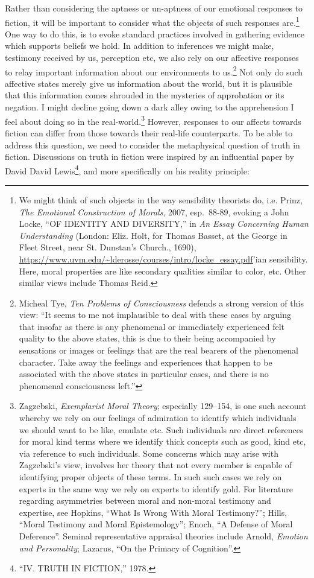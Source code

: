 \documentclass[phdthesis,12pt,final]{wuthesis}
\theoremstyle{definition}
\theoremstyle{definition}
\theoremstyle{definition}
\theoremstyle{definition}
\theoremstyle{remark}
\begin{document}
Rather than considering the aptness or un-aptness of our emotional responses to fiction, it will be important to consider what the objects of such responses are.\footnote{We might think of such objects in the way sensibility theorists do, i.e. Prinz, \emph{The {Emotional Construction} of {Morals}}, 2007, esp.~88-89, evoking a John Locke, {``{OF IDENTITY AND DIVERSITY},''} in \emph{An {Essay Concerning Human Understanding}} (London: Eliz. Holt, for Thomas Basset, at the George in Fleet Street, near St. Dunstan's Church., 1690), \url{https://www.uvm.edu/~lderosse/courses/intro/locke_essay.pdf}'ian sensibility. Here, moral properties are like secondary qualities similar to color, etc. Other similar views include Thomas Reid.} One way to do this, is to evoke standard practices involved in gathering evidence which supports beliefs we hold. In addition to inferences we might make, testimony received by us, perception etc, we also rely on our affective responses to relay important information about our environments to us.\footnote{Micheal Tye, \emph{Ten {Problems} of {Consciousness} } defends a strong version of this view: ``It seems to me not implausible to deal with these cases by arguing that insofar as there is any phenomenal or immediately experienced felt quality to the above states, this is due to their being accompanied by sensations or images or feelings that are the real bearers of the phenomenal character. Take away the feelings and experiences that happen to be associated with the above states in particular cases, and there is no phenomenal consciousness left.''} Not only do such affective states merely give us information about the world, but it is plausible that this information comes shrouded in the mysteries of approbation or its negation. I might decline going down a dark alley owing to the apprehension I feel about doing so in the real-world.\footnote{Zagzebski, \emph{Exemplarist {Moral Theory}}; especially 129--154, is one such account whereby we rely on our feelings of admiration to identify which individuals we should want to be like, emulate etc. Such individuals are direct references for moral kind terms where we identify thick concepts such as good, kind etc, via reference to such individuals. Some concerns which may arise with Zagzebski's view, involves her theory that not every member is capable of identifying proper objects of these terms. In such such cases we rely on experts in the same way we rely on experts to identify gold. For literature regarding asymmetries between moral and non-moral testimony and expertise, see Hopkins, {``What {Is Wrong With Moral Testimony}?''}; Hills, {``Moral Testimony and Moral Epistemology''}; Enoch, {``A {Defense} of {Moral Deference}''}. Seminal representative appraisal theories include Arnold, \emph{Emotion and {Personality}}; Lazarus, {``On the {Primacy} of {Cognition}''}.} However, responses to our affects towards fiction can differ from those towards their real-life counterparts. To be able to address this question, we need to consider the metaphysical question of truth in fiction. Discussions on truth in fiction were inspired by an influential paper by David David Lewis\footnote{{``{IV}. {TRUTH IN FICTION},''} 1978.}, and more specifically on his reality principle:
\end{document}
